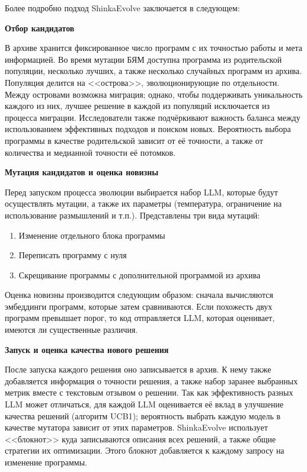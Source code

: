 \documentclass[a4paper,14pt]{extarticle}
\begin{document}
    Более подробно подход ShinkaEvolve заключается в следующем:
    
    \textbf{Отбор кандидатов}
    
    В архиве хранится фиксированное число программ с их точностью работы и мета информацией.
    Во время мутации БЯМ доступна программа из родительской популяции, несколько лучших, а также несколько случайных программ из архива.
    Популяция делится на <<острова>>, эволюционирующие по отдельности.
    Между островами возможна миграция; однако, чтобы поддерживать уникальность каждого из них, лучшее решение в каждой из популяций исключается из процесса миграции. 
    Исследователи также подчёркивают важность баланса между использованием эффективных подходов и поиском новых.
    Вероятность выбора программы в качестве родительской зависит от её точности, а также от количества и медианной точности её потомков.

    \textbf{Мутация кандидатов и оценка новизны}
    
    Перед запуском процесса эволюции выбирается набор LLM, которые будут осуществлять мутации, а также их параметры (температура, ограничение на использование размышлений и т.п.). 
    Представлены три вида мутаций:
    \begin{enumerate}
        \item Изменение отдельного блока программы
        \item Переписать программу с нуля
        \item Скрещивание программы с дополнительной программой из архива
    \end{enumerate}

    Оценка новизны производится следующим образом: сначала вычисляются эмбеддинги программ, которые затем сравниваются.
    Если похожесть двух программ превышает порог, то код отправляется LLM, которая оценивает, имеются ли существенные различия.

    \textbf{Запуск и оценка качества нового решения}
    
    После запуска каждого решения оно записывается в архив.
    К нему также добавляется информация о точности решения, а также набор заранее выбранных метрик вместе с текстовым отзывом о решении.
    Так как эффективность разных LLM может отличаться, для каждой LLM оценивается её вклад в улучшение качества решений (алгоритм UCB1); вероятность выбрать каждую модель в качестве мутатора зависит от этих параметров.
    ShinkaEvolve использует <<блокнот>> куда записываются описания всех решений, а также общие стратегии их оптимизации.
    Этого блокнот добавляется к каждому запросу на изменение программы.
\end{document}
